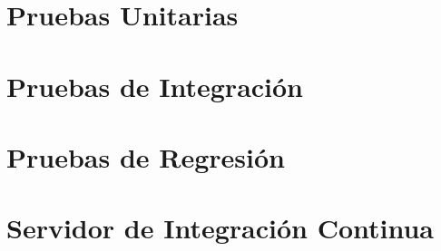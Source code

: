 \section{Pruebas Unitarias}
\section{Pruebas de Integración}
\section{Pruebas de Regresión}
\section{Servidor de Integración Continua}
